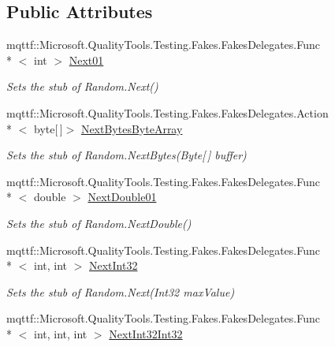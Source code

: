 \subsection*{Public Attributes}
\begin{DoxyCompactItemize}
\item 
mqttf\-::\-Microsoft.\-Quality\-Tools.\-Testing.\-Fakes.\-Fakes\-Delegates.\-Func\\*
$<$ int $>$ \hyperlink{class_system_1_1_fakes_1_1_stub_random_a87e71bc328064b514ac23e1d5b856b6e}{Next01}
\begin{DoxyCompactList}\small\item\em Sets the stub of Random.\-Next()\end{DoxyCompactList}\item 
mqttf\-::\-Microsoft.\-Quality\-Tools.\-Testing.\-Fakes.\-Fakes\-Delegates.\-Action\\*
$<$ byte\mbox{[}$\,$\mbox{]}$>$ \hyperlink{class_system_1_1_fakes_1_1_stub_random_a3882ee04f549d33c5a6e824b2a0e5a30}{Next\-Bytes\-Byte\-Array}
\begin{DoxyCompactList}\small\item\em Sets the stub of Random.\-Next\-Bytes(\-Byte\mbox{[}$\,$\mbox{]} buffer)\end{DoxyCompactList}\item 
mqttf\-::\-Microsoft.\-Quality\-Tools.\-Testing.\-Fakes.\-Fakes\-Delegates.\-Func\\*
$<$ double $>$ \hyperlink{class_system_1_1_fakes_1_1_stub_random_ac6d762f757b6bd2ac89969f681d6c9a5}{Next\-Double01}
\begin{DoxyCompactList}\small\item\em Sets the stub of Random.\-Next\-Double()\end{DoxyCompactList}\item 
mqttf\-::\-Microsoft.\-Quality\-Tools.\-Testing.\-Fakes.\-Fakes\-Delegates.\-Func\\*
$<$ int, int $>$ \hyperlink{class_system_1_1_fakes_1_1_stub_random_a79180cc57c0f0c0e27dc811713b87585}{Next\-Int32}
\begin{DoxyCompactList}\small\item\em Sets the stub of Random.\-Next(\-Int32 max\-Value)\end{DoxyCompactList}\item 
mqttf\-::\-Microsoft.\-Quality\-Tools.\-Testing.\-Fakes.\-Fakes\-Delegates.\-Func\\*
$<$ int, int, int $>$ \hyperlink{class_system_1_1_fakes_1_1_stub_random_a5e9be99ce52de716c58668512fd06787}{Next\-Int32\-Int32}

\end{DoxyCompactItemize}
